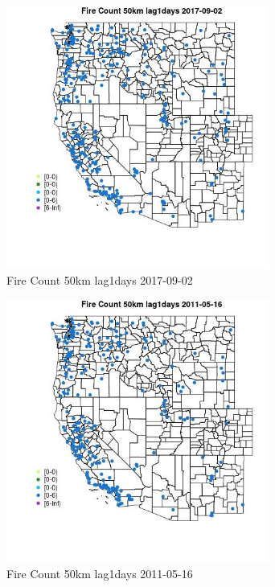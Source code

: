 \begin{figure} 
\centering  
\includegraphics[width=0.77\textwidth]{Code_Outputs/Report_ML_input_PM25_Step4_part_e_de_duplicated_aves_compiled_2019-05-20wNAs_MapObsFire_Count_50km_lag1days2017-09-02.jpg} 
\caption{\label{fig:Report_ML_input_PM25_Step4_part_e_de_duplicated_aves_compiled_2019-05-20wNAsMapObsFire_Count_50km_lag1days2017-09-02}Fire Count 50km lag1days 2017-09-02} 
\end{figure} 
 

\clearpage 

\begin{figure} 
\centering  
\includegraphics[width=0.77\textwidth]{Code_Outputs/Report_ML_input_PM25_Step4_part_e_de_duplicated_aves_compiled_2019-05-20wNAs_MapObsFire_Count_50km_lag1days2011-05-16.jpg} 
\caption{\label{fig:Report_ML_input_PM25_Step4_part_e_de_duplicated_aves_compiled_2019-05-20wNAsMapObsFire_Count_50km_lag1days2011-05-16}Fire Count 50km lag1days 2011-05-16} 
\end{figure} 
 

